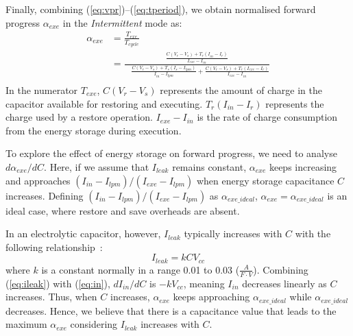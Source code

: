 Finally, combining (\ref{eq:vpr})--(\ref{eq:tperiod}), we obtain normalised forward progress $\alpha_{exe}$ in the \textit{Intermittent} mode as:
\begin{equation}
    \begin{aligned}
        \alpha_{exe} &= \frac{T_{exe}}{T_{cycle}} \\ %
                     &= \frac{\frac{C (V_{r} - V_{s}) + T_{r} (I_{in} - I_{r})} {I_{exe} - I_{in}}}{\quad \frac{C (V_{r} - V_{s}) + T_{s} (I_{s} - I_{lpm})}{I_{in} - I_{lpm}} + \frac{C (V_{r} - V_{s}) + T_{r} (I_{exe} - I_{r})}{I_{exe} - I_{in}}} \\
    \end{aligned}
    \label{eq:texepercent}
\end{equation}
In the numerator $T_{exe}$, $C(V_{r} - V_{s})$ represents the amount of charge in the capacitor available for restoring and executing. $T_{r} (I_{in} - I_{r})$ represents the charge used by a restore operation. $I_{exe} - I_{in}$ is the rate of charge consumption from the energy storage during execution.


To explore the effect of energy storage on forward progress, we need to analyse $d\alpha_{exe} / dC$. Here, if we assume that $I_{leak}$ remains constant, $\alpha_{exe}$ keeps increasing and approaches $(I_{in} - I_{lpm}) / (I_{exe} - I_{lpm})$ when energy storage capacitance $C$ increases. Defining $(I_{in} - I_{lpm}) / (I_{exe} - I_{lpm})$ as $\alpha_{exe\_ideal}$, $\alpha_{exe} = \alpha_{exe\_ideal}$ is an ideal case, where restore and save overheads are absent.

In an electrolytic capacitor, however, $I_{leak}$ typically increases with $C$ with the following relationship~\cite{avxleakage}:
\begin{equation}
    I_{leak} = kCV_{cc}
    \label{eq:ileak}
\end{equation}
where $k$ is a constant normally in a range 0.01 to 0.03 ($\frac{A}{F \cdot V}$). Combining (\ref{eq:ileak}) with (\ref{eq:in}), $dI_{in} / dC$ is $-kV_{cc}$, meaning $I_{in}$ decreases linearly as $C$ increases. Thus, when $C$ increases, $\alpha_{exe}$ keeps approaching $\alpha_{exe\_ideal}$ while $\alpha_{exe\_ideal}$ decreases. Hence, we believe that there is a capacitance value that leads to the maximum $\alpha_{exe}$ considering $I_{leak}$ increases with $C$.


